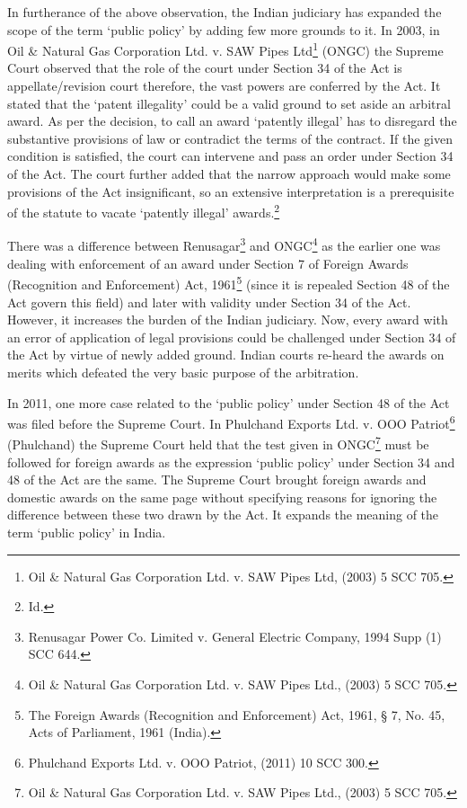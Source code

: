 \begin{multicols}{2}
\noi
In furtherance of the above observation, the Indian judiciary has expanded the scope of the
term ‘public policy’ by adding few more grounds to it. In 2003, in Oil \& Natural Gas
Corporation Ltd. v. SAW Pipes Ltd\footnote{Oil \& Natural Gas Corporation Ltd. v. SAW Pipes Ltd, (2003) 5 SCC 705.} (ONGC) the Supreme Court observed that the role of
the court under Section 34 of the Act is appellate/revision court therefore, the vast powers are
conferred by the Act. It stated that the ‘patent illegality’ could be a valid ground to set aside
an arbitral award. As per the decision, to call an award ‘patently illegal’ has to disregard the
substantive provisions of law or contradict the terms of the contract. If the given condition is
satisfied, the court can intervene and pass an order under Section 34 of the Act. The court
further added that the narrow approach would make some provisions of the Act insignificant,
so an extensive interpretation is a prerequisite of the statute to vacate ‘patently illegal’
awards.\footnote{Id.}

\vspace{-.1cm}

\noi
There was a difference between Renusagar\footnote{Renusagar Power Co. Limited v. General Electric Company, 1994 Supp (1) SCC 644.} and ONGC\footnote{Oil \& Natural Gas Corporation Ltd. v. SAW Pipes Ltd., (2003) 5 SCC 705.} as the earlier one was dealing with
enforcement of an award under Section 7 of Foreign Awards (Recognition and Enforcement)
Act, 1961\footnote{The Foreign Awards (Recognition and Enforcement) Act, 1961, § 7, No. 45, Acts of Parliament, 1961 (India).} (since it is repealed Section 48 of the Act govern this field) and later with validity
under Section 34 of the Act. However, it increases the burden of the Indian judiciary. Now,
every award with an error of application of legal provisions could be challenged under Section
34 of the Act by virtue of newly added ground. Indian courts re-heard the awards on merits
which defeated the very basic purpose of the arbitration.

\vspace{-.1cm}

\noi
In 2011, one more case related to the ‘public policy’ under Section 48 of the Act was filed
before the Supreme Court. In Phulchand Exports Ltd. v. OOO Patriot\footnote{Phulchand Exports Ltd. v. OOO Patriot, (2011) 10 SCC 300.} (Phulchand) the
Supreme Court held that the test given in ONGC\footnote{Oil \& Natural Gas Corporation Ltd. v. SAW Pipes Ltd., (2003) 5 SCC 705.} must be followed for foreign awards as the
expression ‘public policy’ under Section 34 and 48 of the Act are the same. The Supreme
Court brought foreign awards and domestic awards on the same page without specifying
reasons for ignoring the difference between these two drawn by the Act. It expands the
meaning of the term ‘public policy’ in India.


\end{multicols}
